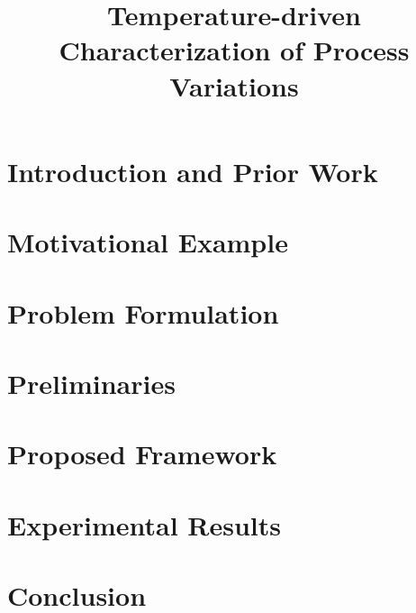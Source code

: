 \documentclass[conference]{IEEEtran}
\begin{document}
  \title{Temperature-driven Characterization of Process Variations}

  \author{
  }

  \maketitle

  \begin{abstract}
    
  \end{abstract}

  \section{Introduction and Prior Work} 
  

  \section{Motivational Example} 
  

  \section{Problem Formulation} 
  

  \section{Preliminaries}  
  

  \section{Proposed Framework} 
  

  \section{Experimental Results} 
  

  \section{Conclusion} 
  

  \begingroup
  \setlength\bibitemsep{2pt}
  \printbibliography
  \endgroup

  \appendix
  
\end{document}
